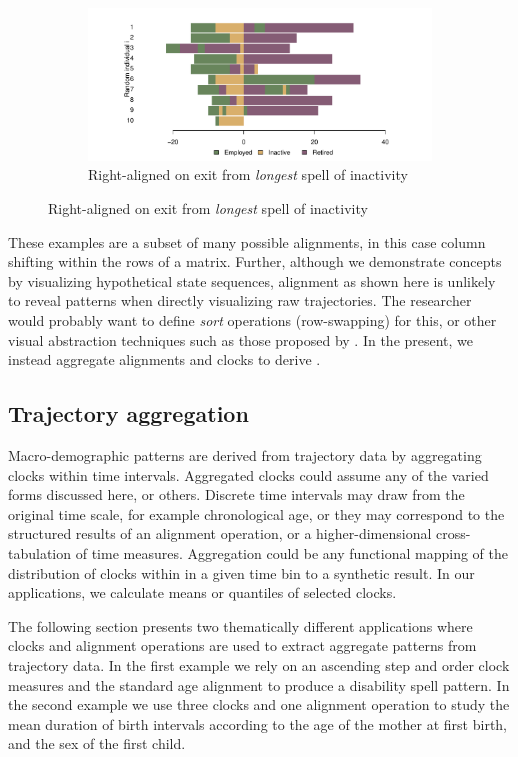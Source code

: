 \documentclass[a4paper,left=1.25cm,right=1.25cm,top=1.25cm,bottom=1.25cm]{article}
\begin{document}
\begin{figure}[ht!]
\begin{subfigure}{\textwidth}
\centering
\caption{Right-aligned on exit from \emph{longest} spell of inactivity}
\label{fig:longinactright}
\includegraphics[scale=.5]{Figures/Seq10inactlongright.pdf}
\end{subfigure}

\end{figure}

These examples are a subset of many possible alignments, in this case column shifting within the rows of a matrix. Further, although we demonstrate concepts by visualizing hypothetical state sequences, alignment as shown here is unlikely to reveal patterns when directly visualizing raw trajectories. The researcher would probably want to define \emph{sort} operations (row-swapping) for this, or other visual abstraction techniques such as those proposed by \citet[e.g.][]{fasang2014visualizing}. In the present, we instead aggregate alignments and clocks to derive .

\FloatBarrier
\subsection{Trajectory aggregation}
Macro-demographic patterns are derived from trajectory data by aggregating clocks within time intervals. Aggregated clocks could assume any of the varied forms discussed here, or others. Discrete time intervals may draw from the original time scale, for example chronological age, or they may correspond to the structured results of an alignment operation, or a higher-dimensional cross-tabulation of time measures. Aggregation could be any functional mapping of the distribution of clocks within in a given time bin to a synthetic result. In our applications, we calculate means or quantiles of selected clocks.

The following section presents two thematically different applications where clocks and alignment operations are used to extract aggregate patterns from trajectory data. In the first example we rely on an ascending step and order clock measures and the standard age alignment to produce a disability spell pattern. In the second example we use three clocks and one alignment operation to study the mean duration of birth intervals according to the age of the mother at first birth, and the sex of the first child.
\end{document}
